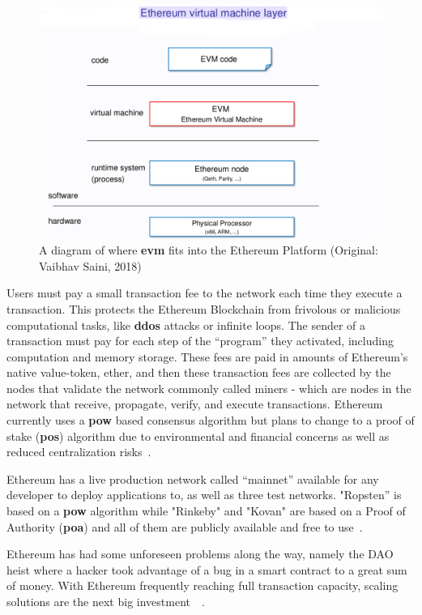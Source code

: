 \begin{figure}[h]
	\centering
	\includegraphics[width=1\linewidth]{imgs/ethereumVirtualMachine.png}
	\caption{\label{fig:evm} A diagram of where \textbf{evm} fits into the Ethereum Platform (Original: Vaibhav Saini, 2018)}
\end{figure}

Users must pay a small transaction fee to the network each time they execute a transaction. This protects the Ethereum Blockchain from frivolous or malicious computational tasks, like \textbf{ddos} attacks or infinite loops. The sender of a transaction must pay for each step of the “program” they activated, including computation and memory storage. These fees are paid in amounts of Ethereum’s native value-token, ether, and then these transaction fees are collected by the nodes that validate the network commonly called miners - which are nodes in the network that receive, propagate, verify, and execute transactions. Ethereum currently uses a \textbf{pow} based consensus algorithm but plans to change to a proof of stake (\textbf{pos}) algorithm due to environmental and financial concerns as well as reduced centralization risks~\cite{EthereumDocs2018,EthereumPOSFAQ2018}.

Ethereum has a live
production network called “mainnet” available for any developer to deploy applications to,
as well as three test networks. "Ropsten” is based on a \textbf{pow} algorithm while "Rinkeby" and "Kovan" are based on a Proof of Authority (\textbf{poa}) and all of them are publicly available and free to use~\cite{Barclay2017,EthereumTestNetworks2018}.

Ethereum has had some unforeseen problems along the way, namely the DAO heist where a hacker took advantage of a bug in a smart contract to a great sum of money. With Ethereum frequently reaching full transaction capacity, scaling solutions are the next big investment~~\cite{ethereumScalability2018}.

